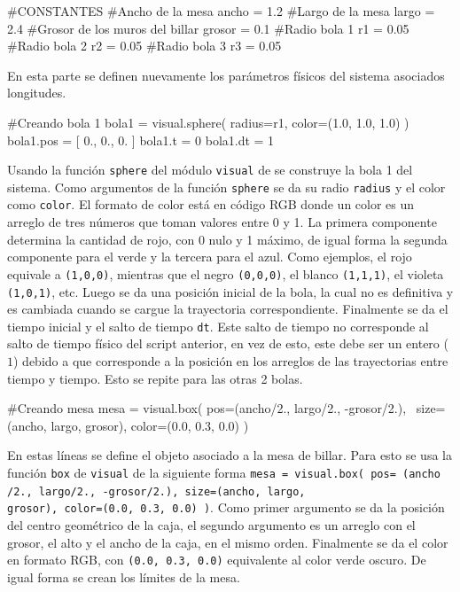 \begin{listing}[style=python, numbers = none]

#CONSTANTES
#Ancho de la mesa
ancho = 1.2
#Largo de la mesa
largo = 2.4
#Grosor de los muros del billar
grosor = 0.1
#Radio bola 1
r1 = 0.05
#Radio bola 2
r2 = 0.05
#Radio bola 3
r3 = 0.05
\end{listing}
En esta parte se definen nuevamente los parámetros físicos del sistema
asociados longitudes.


\begin{listing}[style=python, numbers = none]
#Creando bola 1
bola1 = visual.sphere( radius=r1, color=(1.0, 1.0, 1.0) )
bola1.pos = [ 0., 0., 0. ]
bola1.t = 0
bola1.dt = 1
\end{listing}
Usando la función \texttt{sphere} del módulo \texttt{visual} de \mayavi se
construye la bola 1 del sistema. Como argumentos de la función 
\texttt{sphere} se da su radio \texttt{radius} y el color como \texttt{color}. 
El formato de color está en código RGB donde un color es un arreglo de 
tres números que toman valores entre 0 y 1. La primera componente determina 
la cantidad de rojo, con 0 nulo y 1 máximo, de igual forma la segunda 
componente para el verde y la tercera para el azul. Como ejemplos, el 
rojo equivale a \texttt{(1,0,0)}, mientras que el negro \texttt{(0,0,0)}, 
el blanco \texttt{(1,1,1)}, el violeta \texttt{(1,0,1)}, etc. Luego se da 
una posición inicial de la bola, la cual no es definitiva y es cambiada 
cuando se cargue la trayectoria correspondiente. Finalmente se da el tiempo 
inicial y el salto de tiempo \texttt{dt}. Este salto de tiempo no 
corresponde al salto de tiempo físico del script anterior, en vez de esto, 
este debe ser un entero ($1$) debido a que corresponde a la posición 
en los arreglos de las trayectorias entre tiempo y tiempo. Esto se repite
para las otras 2 bolas.


\begin{listing}[style=python, numbers = none]
#Creando mesa
mesa = visual.box( pos=(ancho/2., largo/2., -grosor/2.), \
size=(ancho, largo, grosor), color=(0.0, 0.3, 0.0) )
\end{listing}
En estas líneas se define el objeto asociado a la mesa de billar. Para esto
se usa la función \texttt{box} de \texttt{visual} de la siguiente forma 
\texttt{mesa = visual.box( pos= (ancho /2., largo/2., -grosor/2.), 
size=(ancho, largo,}\\ \texttt{grosor), color=(0.0, 0.3, 0.0) )}. Como primer argumento 
se da la posición del centro geométrico de la caja, el segundo argumento 
es un arreglo con el grosor, el alto y el ancho de la caja, en el mismo 
orden. Finalmente se da el color en formato RGB, con \texttt{(0.0, 0.3, 0.0)} 
equivalente al color verde oscuro. De igual forma se crean los límites de 
la mesa.



